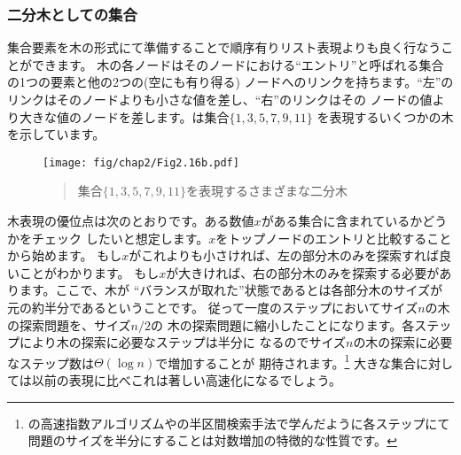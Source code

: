 \subsubsection*{二分木としての集合}



集合要素を木の形式にて準備することで順序有りリスト表現よりも良く行なうことができます。
木の各ノードはそのノードにおける``エントリ''と呼ばれる集合の1つの要素と他の2つの(空にも有り得る)
ノードへのリンクを持ちます。``左''のリンクはそのノードよりも小さな値を差し、``右''のリンクはその
ノードの値より大きな値のノードを差します。は集合\( \{1, 3, 5, 7, 9, 11\} \)
を表現するいくつかの木を示しています。

\begin{figure}[tb]
\label{Figure 2.16}
\centering
\begin{comment}
\heading{Figure 2.16:} Various binary trees that represent the set \( \{1, 3, 5, 7, 9, 11\} \).

\begin{example}
   7          3             5
   /\         /\            /\
  3  9       1  7          3  9
 /\   \         /\        /   /\
1  5  11       5  9      1   7  11
                   \
                   11
\end{example}
\end{comment}
\texttt{[image: fig/chap2/Fig2.16b.pdf]}
\begin{quote}
 集合\( \{1, 3, 5, 7, 9, 11\} \)を表現するさまざまな二分木
\end{quote}
\end{figure}

\noindent
木表現の優位点は次のとおりです。ある数値\( x \)がある集合に含まれているかどうかをチェック
したいと想定します。\( x \)をトップノードのエントリと比較することから始めます。
もし\( x \)がこれよりも小さければ、左の部分木のみを探索すれば良いことがわかります。
もし\( x \)が大きければ、右の部分木のみを探索する必要があります。ここで、木が
``バランスが取れた''状態であるとは各部分木のサイズが元の約半分であるということです。
従って一度のステップにおいてサイズ\( n \)の木の探索問題を、サイズ\( n / 2 \)の
木の探索問題に縮小したことになります。各ステップにより木の探索に必要なステップは半分に
なるのでサイズ\( n \)の木の探索に必要なステップ数は\( \Theta(\log n) \)で増加することが
期待されます。\footnote{
の高速指数アルゴリズムや\link{Section 1.2.4}の半区間検索手法で学んだように各ステップにて
問題のサイズを半分にすることは対数増加の特徴的な性質です。}
大きな集合に対しては以前の表現に比べこれは著しい高速化になるでしょう。



